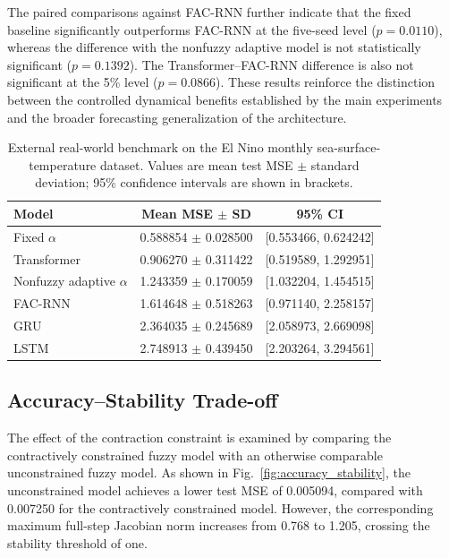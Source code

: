 \documentclass[journal]{IEEEtran}
\begin{document}
The paired comparisons against FAC-RNN further indicate that the fixed baseline significantly outperforms FAC-RNN at the five-seed level ($p=0.0110$), whereas the difference with the nonfuzzy adaptive model is not statistically significant ($p=0.1392$). The Transformer--FAC-RNN difference is also not significant at the 5\% level ($p=0.0866$). These results reinforce the distinction between the controlled dynamical benefits established by the main experiments and the broader forecasting generalization of the architecture.

\begin{table}[t]
\centering
\caption{External real-world benchmark on the El Nino monthly sea-surface-temperature dataset. Values are mean test MSE $\pm$ standard deviation; 95\% confidence intervals are shown in brackets.}
\label{tab:realworld_results}
\begin{tabular}{lcc}
\toprule
Model & Mean MSE $\pm$ SD & 95\% CI \\
\midrule
Fixed $\alpha$ & 0.588854 $\pm$ 0.028500 & [0.553466, 0.624242] \\
Transformer & 0.906270 $\pm$ 0.311422 & [0.519589, 1.292951] \\
Nonfuzzy adaptive $\alpha$ & 1.243359 $\pm$ 0.170059 & [1.032204, 1.454515] \\
FAC-RNN & 1.614648 $\pm$ 0.518263 & [0.971140, 2.258157] \\
GRU & 2.364035 $\pm$ 0.245689 & [2.058973, 2.669098] \\
LSTM & 2.748913 $\pm$ 0.439450 & [2.203264, 3.294561] \\
\bottomrule
\end{tabular}
\end{table}

	
	\subsection{Accuracy--Stability Trade-off}
	\label{subsec:accuracy_stability_results}
	
	The effect of the contraction constraint is examined by comparing the contractively constrained fuzzy model with an otherwise comparable unconstrained fuzzy model. As shown in Fig.~\ref{fig:accuracy_stability}, the unconstrained model achieves a lower test MSE of 0.005094, compared with 0.007250 for the contractively constrained model. However, the corresponding maximum full-step Jacobian norm increases from 0.768 to 1.205, crossing the stability threshold of one.
	
\end{document}
